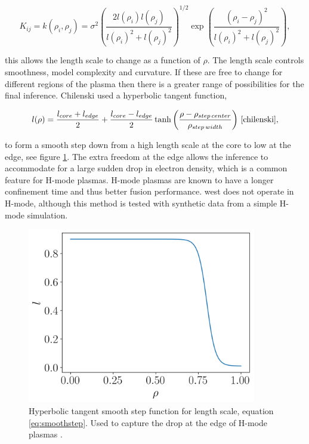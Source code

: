 \begin{equation}
  K_{ij} = k(\rho_i, \rho_j) = \sigma^2 \left( \frac{2l(\rho_i)l(\rho_j)}{l(\rho_i)^2 + l(\rho_j)^2} \right)^{1/2} \exp\left({\frac{(\rho_i - \rho_j)^2}{l(\rho_i)^2+l(\rho_j)^2}}\right),
\end{equation}

\noindent this allows the length scale to change as a function of $\rho$. The length scale controls smoothness, model complexity and curvature. If these are free to change for different regions of the plasma then there is a greater range of possibilities for the final inference. Chilenski used a hyperbolic tangent function,

\begin{equation}
  l(\rho) = \frac{l_{core} + l_{edge}}{2} + \frac{l_{core} - l_{edge}}{2} \tanh\left(\frac{\rho-\rho_{step\,center}}{\rho_{step\,width}}\right) \, \cite{chilenski}, 
  \label{eq:smoothstep}
\end{equation}

\noindent to form a smooth step down from a high length scale at the core to low at the edge, see figure \ref{fig:smoothstep}. The extra freedom at the edge allows the inference to accommodate for a large sudden drop in electron density, which is a common feature for H-mode plasmas. H-mode plasmas are known to have a longer confinement time and thus better fusion performance. \gls{west} does not operate in H-mode, although this method is tested with synthetic data from a simple H-mode simulation.

\begin{figure}[H]
  \centering
  \includegraphics[width=10cm]{images/smoothstep.png}
  \caption{Hyperbolic tangent smooth step function for length scale, equation \ref{eq:smoothstep}. Used to capture the drop at the edge of H-mode plasmas \cite{chilenski}.}
  \label{fig:smoothstep}
\end{figure}


